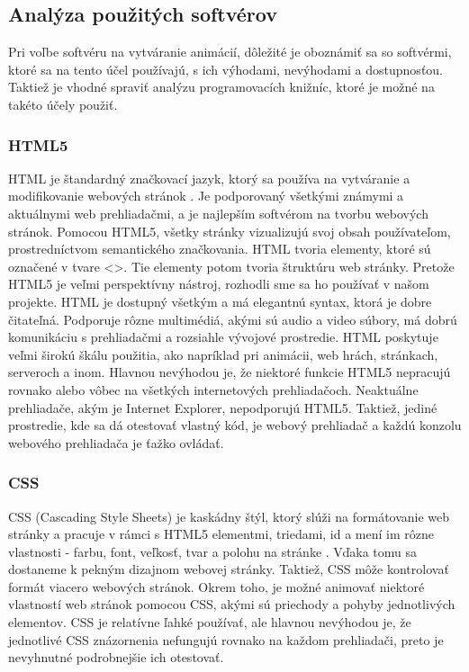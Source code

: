 \newpage

\subsection{Analýza použitých softvérov} 
\noindent Pri voľbe softvéru na vytváranie animácií, dôležité je oboznámiť sa so softvérmi, ktoré sa na tento účel používajú, s ich výhodami, nevýhodami a dostupnosťou. Taktiež je vhodné spraviť analýzu programovacích knižníc, ktoré je možné na takéto účely použiť.

\subsubsection{HTML5} 
\noindent \acrshort{HTML} je štandardný značkovací jazyk, ktorý sa používa na vytváranie a modifikovanie webových stránok \cite{c2}. Je podporovaný všetkými známymi a aktuálnymi web prehliadačmi, a je najlepším softvérom na tvorbu webových stránok. Pomocou \acrshort{HTML5}, všetky stránky vizualizujú svoj obsah používateľom, prostredníctvom semantického značkovania. \acrshort{HTML} tvoria elementy, ktoré sú označené v tvare <>. Tie elementy potom tvoria štruktúru web stránky. Pretože \acrshort{HTML5} je veľmi perspektívny nástroj, rozhodli sme sa ho používať v našom projekte. HTML je dostupný všetkým a má elegantnú syntax, ktorá je dobre čitateľná. Podporuje rôzne multimédiá, akými sú audio a video súbory, má dobrú komunikáciu s prehliadačmi a rozsiahle vývojové prostredie. HTML poskytuje veľmi širokú škálu použitia, ako napríklad pri  animácii, web hrách, stránkach, serveroch a inom. Hlavnou nevýhodou je, že niektoré funkcie HTML5 nepracujú rovnako alebo vôbec na všetkých internetových prehliadačoch. Neaktuálne prehliadače, akým je Internet Explorer, nepodporujú HTML5. Taktiež, jediné prostredie, kde sa dá otestovať vlastný kód, je webový prehliadač a každú konzolu webového prehliadača je ťažko ovládať.

\subsubsection{CSS} 
\noindent \acrshort{CSS} (Cascading Style Sheets) je kaskádny štýl, ktorý slúži na formátovanie web stránky a pracuje v rámci s HTML5 elementmi, triedami, id a mení im rôzne vlastnosti -  farbu, font, veľkosť, tvar a polohu na stránke \cite{c3}. Vďaka tomu sa dostaneme k pekným dizajnom webovej stránky. Taktiež, CSS môže kontrolovať formát viacero webových stránok. Okrem toho, je možné animovať niektoré vlastností web stránok pomocou CSS, akými sú priechody a pohyby jednotlivých elementov. CSS je relatívne ľahké používať, ale hlavnou nevýhodou je, že jednotlivé CSS znázornenia nefungujú rovnako na každom prehliadači, preto je nevyhnutné podrobnejšie ich otestovať.

